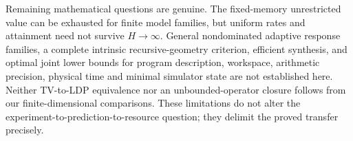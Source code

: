 Remaining mathematical questions are genuine. The fixed-memory unrestricted value can be exhausted for finite model families, but uniform rates and attainment need not survive $H\to\infty$. General nondominated adaptive response families, a complete intrinsic recursive-geometry criterion, efficient synthesis, and optimal joint lower bounds for program description, workspace, arithmetic precision, physical time and minimal simulator state are not established here. Neither TV-to-LDP equivalence nor an unbounded-operator closure follows from our finite-dimensional comparisons. These limitations do not alter the experiment-to-prediction-to-resource question; they delimit the proved transfer precisely.
